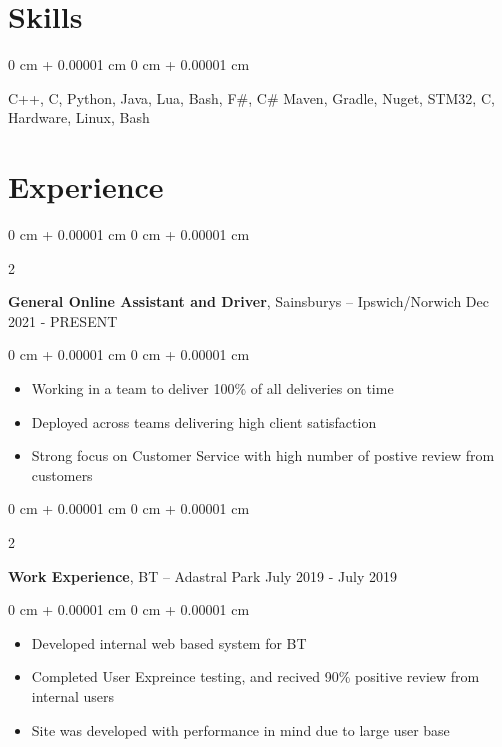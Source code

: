 \documentclass[10pt, letterpaper]{article}
\newenvironment{highlights}{
    \begin{itemize}[
        topsep=0.10 cm,
        parsep=0.10 cm,
        partopsep=0pt,
        itemsep=0pt,
        leftmargin=0 cm + 10pt
    ]
}{
    \end{itemize}
} %
\newenvironment{onecolentry}{
    \begin{adjustwidth}{
        0 cm + 0.00001 cm
    }{
        0 cm + 0.00001 cm
    }
}{
    \end{adjustwidth}
} %
\newenvironment{twocolentry}[2][]{
    \onecolentry
    \def\secondColumn{#2}
    \setcolumnwidth{\fill, 4.5 cm}
    \begin{paracol}{2}
}{
    \switchcolumn \raggedleft \secondColumn
    \end{paracol}
    \endonecolentry
} %
\begin{document}
    \section{Skills}
    \begin{onecolentry}
        C++, C, Python, Java, Lua, Bash, F\#, C\# Maven, Gradle, Nuget, STM32, C, Hardware, Linux, Bash
    \end{onecolentry}
    \section{Experience}

    \begin{twocolentry}{
        Dec 2021 - PRESENT
    }
        \textbf{General Online Assistant and Driver}, Sainsburys -- Ipswich/Norwich\end{twocolentry}
    \begin{onecolentry}
        \begin{highlights}
            \item Working in a team to deliver 100\% of all deliveries on time 
            \item Deployed across teams delivering high client satisfaction
            \item Strong focus on Customer Service with high number of postive review from customers
        \end{highlights}
    \end{onecolentry}

    \vspace{0.2 cm}
    \begin{twocolentry}{
        July 2019 - July 2019
    }
        \textbf{Work Experience}, BT -- Adastral Park\end{twocolentry}
    \begin{onecolentry}
        \begin{highlights}
            \item Developed internal web based system for BT
            \item Completed User Expreince testing, and recived 90\% positive review from internal users
            \item Site was developed with performance in mind due to large user base
        \end{highlights}
    \end{onecolentry}
\end{document}
